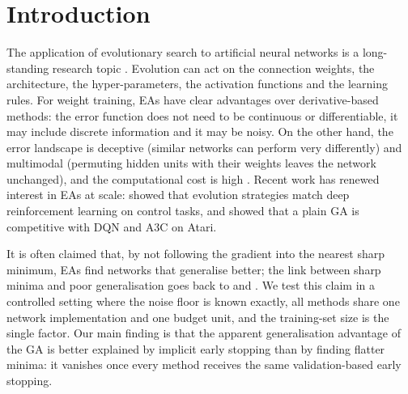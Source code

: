 \documentclass[11pt,a4paper]{article}
\newcommand{\cmaes}{CMA-ES}
\newcommand{\lbfgs}{L-BFGS-B}
\begin{document}
\begin{abstract}
We compare two evolutionary algorithms (\cmaes{} and a real-coded GA) with two derivative-based methods
(\lbfgs{} and Adam) for training a one-hidden-layer MLP (41 weights) on a synthetic regression problem
with known noise floor $\sigma^2=0.09$, at the same budget of $10^5$ error-function evaluations, for
$n\in\{25,100,400,1600\}$ training points and 30 paired seeds. With the network of lowest training error,
the GA has the lowest test error at $n\le100$ and the highest at $n=1600$, but the highest training error
at every $n$. When every method receives the same early stopping on a selection set of $n$ points, the
advantage disappears, and the gradient methods reach their best networks with 5--1000$\times$ fewer
evaluations. GA solutions are flatter than \lbfgs{} solutions at equal training error, but flatness does
not predict test error. The apparent advantage is implicit early stopping, not a better minimum.
\end{abstract}

\section{Introduction}

The application of evolutionary search to artificial neural networks is a long-standing research topic
\citep{yao1999evolving}. Evolution can act on the connection weights, the architecture, the
hyper-parameters, the activation functions and the learning rules. For weight training, EAs have clear
advantages over derivative-based methods: the error function does not need to be continuous or
differentiable, it may include discrete information and it may be noisy. On the other hand, the error
landscape is deceptive (similar networks can perform very differently) and multimodal (permuting hidden
units with their weights leaves the network unchanged), and the computational cost is high
\citep{yao1999evolving}. Recent work has renewed interest in EAs at scale: \citet{salimans2017evolution}
showed that evolution strategies match deep reinforcement learning on control tasks, and
\citet{such2017deep} showed that a plain GA is competitive with DQN and A3C on Atari.

It is often claimed that, by not following the gradient into the nearest sharp minimum, EAs find networks that
generalise better; the link between sharp minima and poor generalisation goes back to \citet{hochreiter1997flat} and  \citet{keskar2017large}.
We test this claim in a controlled setting
where the noise floor is known exactly, all methods share one network implementation and one budget
unit, and the training-set size is the single factor. Our main finding is that the apparent
generalisation advantage of the GA is better explained by implicit early stopping than by finding
flatter minima: it vanishes once every method receives the same validation-based early stopping.
\end{document}
